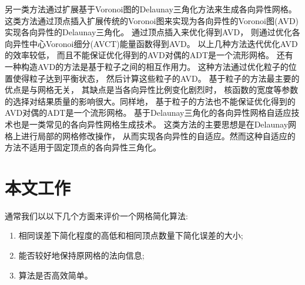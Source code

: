 另一类方法通过扩展基于Voronoi图的Delaunay三角化方法来生成各向异性网格。 这类方法通过顶点插入扩展传统的Voronoi图来实现为各向异性的Voronoi图(AVD)实现各向异性的Delaunay三角化。 \cite{Labelle:2003:AVD:777792.777822}通过顶点插入来优化得到AVD， \cite{Du:2005:ACV:1046640.1046658, Valette:2008:GRT:1340081.1340168, Levy:2010:LPC:1778765.1778856, bruno:hal-00804558}则通过优化各向异性中心Voronoi细分(AVCT)能量函数得到AVD。 以上几种方法迭代优化AVD的效率较低， 而且不能保证优化得到的AVD对偶的ADT是一个流形网格\cite{Canas2011}。 还有一种构造AVD的方法是基于粒子之间的相互作用力\cite{ATPSCPE, PASM}。 这种方法通过优化粒子的位置使得粒子达到平衡状态， 然后计算这些粒子的AVD。 基于粒子的方法最主要的优点是与网格无关， 其缺点是当各向异性比例变化剧烈时， 核函数的宽度等参数的选择对结果质量的影响很大。同样地， 基于粒子的方法也不能保证优化得到的AVD对偶的ADT是一个流形网格。
基于Delaunay三角化的各向异性网格自适应技术也是一类常见的各向异性网格生成技术\cite{Jiao2009}。 这类方法的主要思想是在Delaunay网格上进行局部的网格修改操作， 从而实现各向异性的自适应。然而这种自适应的方法不适用于固定顶点的各向异性三角化。

\section{本文工作}
通常我们以以下几个方面来评价一个网格简化算法:
\begin{enumerate}[（1）]
\item 相同误差下简化程度的高低和相同顶点数量下简化误差的大小;
\item 能否较好地保持原网格的法向信息;
\item 算法是否高效简单。
\end{enumerate}


